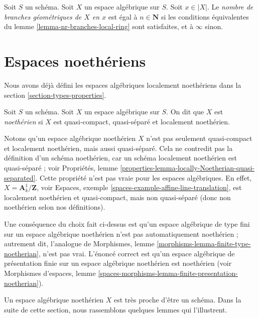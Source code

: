 \begin{definition}
\label{definition-number-of-geometric-branches}
Soit $S$ un schéma.
Soit $X$ un espace algébrique sur $S$.
Soit $x \in |X|$. Le {\it nombre de branches géométriques de $X$ en $x$} est
égal à $n \in \mathbf{N}$ si les conditions équivalentes du
lemme \ref{lemma-nr-branches-local-ring}
sont satisfaites, et à $\infty$ sinon.
\end{definition}








\section{Espaces noethériens}
\label{section-noetherian}

\noindent
Nous avons déjà défini les espaces algébriques localement noethériens dans la
section \ref{section-types-properties}.

\begin{definition}
\label{definition-noetherian}
Soit $S$ un schéma. Soit $X$ un espace algébrique sur $S$.
On dit que $X$ est {\it noethérien} si $X$ est quasi-compact, quasi-séparé
et localement noethérien.
\end{definition}

\noindent
Notons qu'un espace algébrique noethérien $X$ n'est pas seulement quasi-compact
et localement noethérien, mais aussi quasi-séparé. Cela ne contredit pas
la définition d'un schéma noethérien, car un schéma localement noethérien
est quasi-séparé ; voir
Propriétés, lemme \ref{properties-lemma-locally-Noetherian-quasi-separated}.
Cette propriété n'est pas vraie pour les espaces algébriques. En effet,
$X = \mathbf{A}^1_k/\mathbf{Z}$, voir
Espaces, exemple \ref{spaces-example-affine-line-translation},
est localement noethérien et quasi-compact, mais non quasi-séparé
(donc non noethérien selon nos définitions).

\medskip\noindent
Une conséquence du choix fait ci-dessus est qu'un espace algébrique
de type fini sur un espace algébrique noethérien n'est pas automatiquement
noethérien ; autrement dit, l'analogue de
Morphismes, lemme \ref{morphisms-lemma-finite-type-noetherian},
n'est pas vrai. L'énoncé correct est qu'un espace algébrique de
présentation finie sur un espace algébrique noethérien est noethérien
(voir
Morphismes d'espaces,
lemme \ref{spaces-morphisms-lemma-finite-presentation-noetherian}).

\medskip\noindent
Un espace algébrique noethérien $X$ est très proche d'être un schéma.
Dans la suite de cette section, nous rassemblons quelques lemmes qui l'illustrent.

